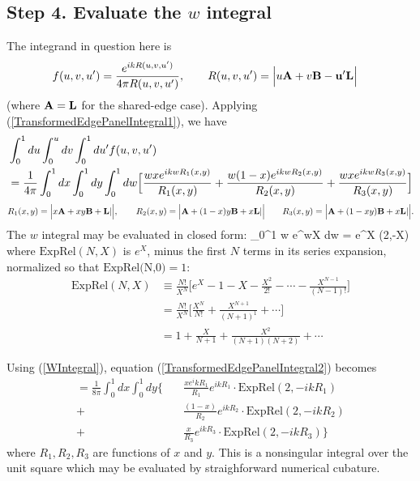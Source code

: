 \documentclass[letterpaper]{article}
\begin{document}
\subsection*{Step 4. Evaluate the $w$ integral}

The integrand in question here is 
\begin{align*}
 f(u,v,u^\prime)
&=\frac{e^{ikR(u,v,u^\prime)}}{4\pi R(u,v,u^\prime)},
\qquad 
 R(u,v,u^\prime)=\Big|u\mathbf{A} + v\mathbf{B} - \mathbf{u}^\prime \mathbf{L}\Big|
\end{align*}
(where $\mathbf{A}=\mathbf{L}$ for the shared-edge case).
Applying (\ref{TransformedEdgePanelIntegral1}), we have
\begin{align}
&\int_0^1 du \int_0^u dv \int_0^1 du^\prime f(u,v,u^\prime)
\nonumber \\
&=\frac{1}{4\pi}\int_0^1 dx \int_0^1 dy \int_0^1 dw
\Big[  \frac{ w x     e^{ikwR_1(x,y)}}{R_1(x,y)} 
     + \frac{ w (1-x) e^{ikwR_2(x,y)}}{R_2(x,y)} 
     + \frac{ w x     e^{ikwR_3(x,y)}}{R_3(x,y)}
\Big] 
\label{TransformedEdgePanelIntegral2}
\end{align}
$$ R_1(x,y)=\Big| x\mathbf{A} + xy \mathbf{B} + \mathbf{L}|\Big|,
   \qquad
   R_2(x,y)=\Big| \mathbf{A} + (1-x)y \mathbf{B} + x\mathbf{L}|\Big|
   \qquad
   R_3(x,y)=\Big| \mathbf{A} + (1-xy) \mathbf{B} + x\mathbf{L}|\Big|.
$$
The $w$ integral may be evaluated in closed form:
{\int_0^1 w e^{wX} dw  = e^X \cdot {}(2,-X)}
where $\text{ExpRel}(N,X)$ is 
$e^X$, minus the first $N$ terms in its series expansion,
normalized so that $\text{ExpRel(N,0)}=1$:
\begin{align*}
 \text{ExpRel}(N,X) &\equiv
   \frac{N!}{X^N}\Big[e^{X} - 1 - X - \frac{X^2}{2!} - \cdots 
                             - \frac{X^{N-1}}{(N-1)!} \Big]
\\
&=
   \frac{N!}{X^N}\Big[\frac{X^N}{N!} + \frac{X^{N+1}}{(N+1)^1} + \cdots\Big] 
\\
&=
   1 + \frac{X}{N+1} + \frac{X^2}{(N+1)(N+2)} + \cdots
\end{align*}

Using (\ref{WIntegral}), equation (\ref{TransformedEdgePanelIntegral2})
becomes 
\begin{align*}
=\frac{1}{8\pi}\int_0^1 dx \int_0^1 dy \bigg\{
 \quad &\frac{x e^ikR_1}{R_1} e^{ikR_1} \cdot \text{ExpRel}(2,-ikR_1)
\\
      +&\frac{(1-x)}{R_2} e^{ikR_2} \cdot \text{ExpRel}(2,-ikR_2)
\\
      +&\frac{x}{R_3}e^{ikR_3} \cdot \text{ExpRel}(2,-ikR_3)
  \bigg\}
\end{align*}
where $R_1, R_2, R_3$ are functions of $x$ and $y$. This is a nonsingular
integral over the unit square which may be evaluated by straighforward
numerical cubature.
\end{document}
